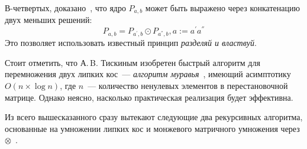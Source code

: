 В-четвертых, доказано~\cite{tiskin2006all}, что  ядро $P_{a,b}$ может быть выражено через конкатенацию двух меньших решений:
\begin{equation}\label{formulaKernelCompistion}
P_{a,b}  = P_{a^{'},b} \odot P_{a^{''},b}, a  := a^{'}a^{''}
\end{equation}
Это позволяет использовать известный принцип \emph{разделяй и властвуй}.

Стоит отметить, что А.\,B. Тискиным изобретен быстрый алгоритм для перемножения двух липких кос~--- \emph{алгоритм муравья}~\cite{tiskin2015fast}, имеющий асимптотику $O(n\times \log n)$, где $n$~--- количество ненулевых элементов в перестановочной матрице.
Однако неясно, насколько практическая реализация будет эффективна.

Из всего вышесказанного сразу вытекают следующие два рекурсивных алгоритма, основанные на умножении липких кос  и монжевого матричного умножения через $\otimes$~\cite{tiskin2008semi}.


